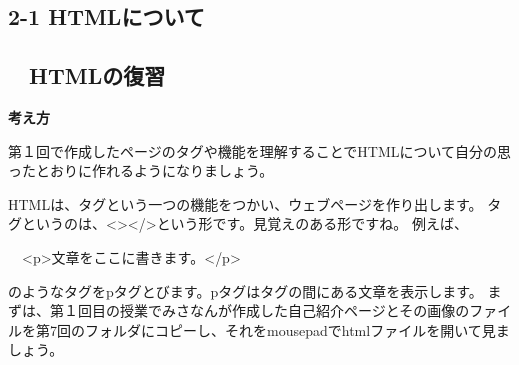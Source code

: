 \subsection*{2-1 HTMLについて　　　　　　　　　　　　　　　　　　　　　　　　}
\label{P:HTML}
\subsection*{\theExercise　HTMLの復習\label{E:HTML}}
{\bfseries
	考え方\newline

	第１回で作成したページのタグや機能を理解することでHTMLについて自分の思ったとおりに作れるようになりましょう。}


\bigskip

\bigskip

HTMLは、タグという一つの機能をつかい、ウェブページを作り出します。\newline
タグというのは、{\textless}{\textgreater}{\textless}/{\textgreater}という形です。見覚えのある形ですね。\newline
例えば、

\ \ {\textless}p{\textgreater}文章をここに書きます。{\textless}/p{\textgreater}

のようなタグをpタグとびます。pタグはタグの間にある文章を表示します。\newline
まずは、第１回目の授業でみさなんが作成した自己紹介ページとその画像のファイルを第7回のフォルダにコピーし、それをmousepadでhtmlファイルを開いて見ましょう。

